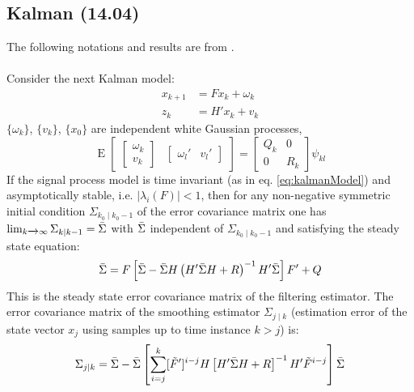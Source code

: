 \documentclass[oneside,12pt]{article}
\newcommand{\abs}[1]{\left| #1\right| }                   %
\begin{document}
\subsection{Kalman (14.04)}\label{sec:subKalman}
%
The following notations and results are from \cite{nla.cat-vn941564}.\\\\
%
Consider the next Kalman model:
\begin{equation}\label{eq:kalmanModel}
    \begin{split}
        x_{k+1} &= Fx_k + \omega_k\\
        z_k &= H'x_k + v_k
    \end{split}
\end{equation}
%
$\{\omega_k\}$, $\{v_k\}$, $\{x_0\}$ are independent white Gaussian processes,
%
\begin{equation}
    \operatorname{E} \begin{bmatrix} \begin{bmatrix} \omega_k \\ v_k \end{bmatrix} &  \begin{bmatrix} \omega_l' & v_l' \end{bmatrix} \end{bmatrix} = \begin{bmatrix} Q_k & 0 \\ 0 & R_k\end{bmatrix} \psi_{kl}
\end{equation}
%
If the signal process model is time invariant (as in eq. \ref{eq:kalmanModel}) and asymptotically stable, i.e. $\abs{\lambda_i(F)}<1$, then for any non-negative symmetric initial condition $\Sigma_{k_0 \mid k_0 -1}$ of the error covariance matrix one has $\operatorname{lim}_{k \xrightarrow{} \infty} \Sigma_{k \mid k-1}= \Bar{\Sigma}$ with $\Bar{\Sigma}$ independent of $\Sigma_{k_0 \mid k_0 -1}$ and satisfying the steady state equation:
%
\begin{equation}\label{eq:sigma_bar}
    \Bar{\Sigma} = F \left[\Bar{\Sigma} - \Bar{\Sigma} H \left( H'\Bar{\Sigma}H+R \right)^{-1}H'\Bar{\Sigma} \right] F' + Q
\end{equation}
%
This is the steady state error covariance matrix of the filtering estimator.
%
The error covariance matrix of the smoothing estimator $\Sigma_{j \mid k}$ (estimation error of the state vector $x_j$ using samples up to time instance $k>j$) is:
%
\begin{equation}\label{eq:sigma_smoothing}
    \Sigma_{j \mid k} = \Bar{\Sigma} - \Bar{\Sigma} \left[ \sum_{i=j}^k [\tilde{F}']^{i-j} H \left[ H' \Bar{\Sigma} H + R\right]^{-1}H'\tilde{F}^{i-j}\right]\Bar{\Sigma}
\end{equation}
\end{document}
